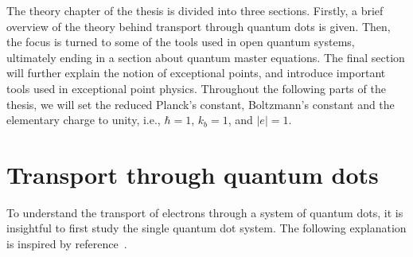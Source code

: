 \documentclass[../main.tex]{subfiles}
\begin{document}
The theory chapter of the thesis is divided into three sections. Firstly, a brief overview of the theory behind transport through quantum dots is given. Then, the focus is turned to some of the tools used in open quantum systems, ultimately ending in a section about quantum master equations. The final section will further explain the notion of exceptional points, and introduce important tools used in exceptional point physics. Throughout the following parts of the thesis, we will set the reduced Planck's constant, Boltzmann's constant and the elementary charge to unity, i.e., $\hbar=1$, $k_b=1$, and $|e|=1$.

\section{Transport through quantum dots}
To understand the transport of electrons through a system of quantum dots, it is insightful to first study the single quantum dot system. The following explanation is inspired by reference~\cite{transport}.
\end{document}
